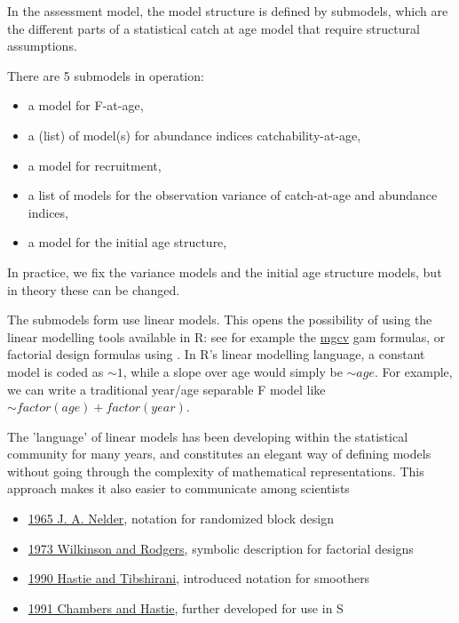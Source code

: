 \documentclass[a4paper,english,10pt]{article}\usepackage[]{graphicx}\usepackage[]{color}
\begin{document}
In the \aFa assessment model, the model structure is defined by submodels, which are the different parts of a statistical catch at age model that require structural assumptions.

There are 5 submodels in operation: 
\begin{itemize}
	\item a model for F-at-age,
	\item a (list) of model(s) for abundance indices catchability-at-age,
	\item a model for recruitment, 
	\item a list of models for the observation variance of catch-at-age and abundance indices,
	\item a model for the initial age structure,
\end{itemize}	
	
In practice, we fix the variance models and the initial age structure models, but in theory these can be changed.

The submodels form use linear models. This opens the possibility of using the linear modelling tools available in R: see for example the \href{http://cran.r-project.org/web/packages/mgcv/index.html}{mgcv} gam formulas, or factorial design formulas using . In R's linear modelling language, a constant model is coded as $\sim 1$, while a slope over age would simply be $\sim age$. For example, we can write a traditional year/age separable F model like $\sim factor(age) + factor(year)$.

The 'language' of linear models has been developing within the statistical community for many years, and constitutes an elegant way of defining models without going through the complexity of mathematical representations. This approach makes it also easier to communicate among scientists
  \begin{itemize}
  \item \href{http://rspa.royalsocietypublishing.org/content/283/1393/147.short}{1965 J. A. Nelder}, notation for randomized block design
  \item \href{http://www.jstor.org/stable/info/2346786}{1973 Wilkinson and Rodgers}, symbolic description for factorial designs
  \item \href{http://books.google.com/books?isbn=0412343908}{1990 Hastie and Tibshirani}, introduced notation for smoothers
  \item \href{http://books.google.com/books?isbn=041283040X}{1991 Chambers and Hastie}, further developed for use in S
  \end{itemize}
\end{document}
